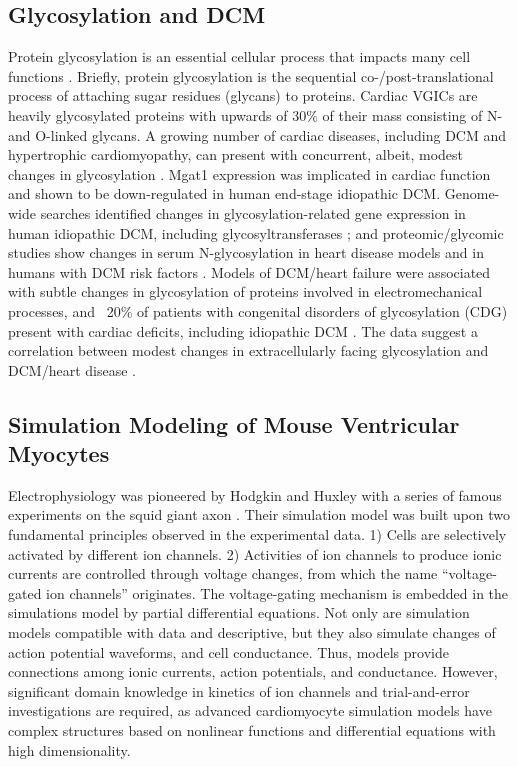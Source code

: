 \documentclass[journal]{IEEEtran}
\begin{document}
\subsection{Glycosylation and DCM}
Protein glycosylation is an essential cellular process that impacts many cell functions \cite{marques2017cardiac}. Briefly, protein glycosylation is the sequential co-/post-translational process of attaching sugar residues (glycans) to proteins. Cardiac VGICs are heavily glycosylated proteins with upwards of 30\% of their mass consisting of N- and O-linked glycans. A growing number of cardiac diseases, including DCM and hypertrophic cardiomyopathy, can present with concurrent, albeit, modest changes in glycosylation \cite{gehrmann2003cardiomyopathy, footitt2009cardiomyopathy, marques2017cardiac}. Mgat1 expression was implicated in cardiac function and shown to be down-regulated in human end-stage idiopathic DCM. Genome-wide searches identified changes in glycosylation-related gene expression in human idiopathic DCM, including glycosyltransferases \cite{barrans2002global, hwang2002microarray, yung2004gene}; and proteomic/glycomic studies show changes in serum N-glycosylation in heart disease models and in humans with DCM risk factors \cite{nishio1995identification, knezevic2009variability, miura2016glycomics, nagai2016aberrant, yang2015glycoproteins}. Models of DCM/heart failure were associated with subtle changes in glycosylation of proteins involved in electromechanical processes, and ~20\% of patients with congenital disorders of glycosylation (CDG) present with cardiac deficits, including idiopathic DCM \cite{gehrmann2003cardiomyopathy, marques2017cardiac}. The data suggest a correlation between modest changes in extracellularly facing glycosylation and DCM/heart disease \cite{yung2004gene, hwang2002microarray, barrans2002global, nagai2016aberrant, yang2015glycoproteins}. 

\subsection{Simulation Modeling of Mouse Ventricular Myocytes}
Electrophysiology was pioneered by Hodgkin and Huxley with a series of famous experiments on the squid giant axon \cite{hodgkin1952quantitative}. Their simulation model was built upon two fundamental principles observed in the experimental data. 1) Cells are selectively activated by different ion channels. 2) Activities of ion channels to produce ionic currents are controlled through voltage changes, from which the name ``voltage-gated ion channels'' originates. The voltage-gating mechanism is embedded in the simulations model by partial differential equations. Not only are simulation models compatible with data and descriptive, but they also simulate changes of action potential waveforms, and cell conductance. Thus, models provide connections among ionic currents, action potentials, and conductance. However, significant domain knowledge in kinetics of ion channels and trial-and-error investigations are required, as advanced cardiomyocyte simulation models have complex structures based on nonlinear functions and differential equations with high dimensionality.
\end{document}
